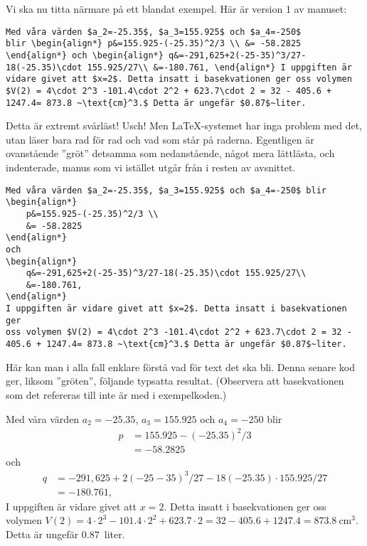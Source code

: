 \documentclass[a4paper,12pt]{article}
\begin{document}
Vi ska nu titta närmare på ett blandat exempel. Här är version 1 av
manuset:
%
\label{page:v1}
\begin{lstlisting} 
Med våra värden $a_2=-25.35$, $a_3=155.925$ och $a_4=-250$
blir \begin{align*} p&=155.925-(-25.35)^2/3 \\ &= -58.2825 
\end{align*} och \begin{align*} q&=-291,625+2(-25-35)^3/27-
18(-25.35)\cdot 155.925/27\\ &=-180.761, \end{align*} I uppgiften är
vidare givet att $x=2$. Detta insatt i basekvationen ger oss volymen
$V(2) = 4\cdot 2^3 -101.4\cdot 2^2 + 623.7\cdot 2 = 32 - 405.6 +
1247.4= 873.8 ~\text{cm}^3.$ Detta är ungefär $0.87$~liter. 
\end{lstlisting}
%
Detta är extremt svårläst! Usch! Men \LaTeX-systemet har inga problem med det,
utan läser bara rad för rad och vad som står på raderna.
Egentligen är ovanstående ''gröt'' detsamma som nedanstående,
något mera lättlästa, och indenterade, manus som vi istället utgår
från i resten av avsnittet.  
%
\begin{lstlisting}
Med våra värden $a_2=-25.35$, $a_3=155.925$ och $a_4=-250$ blir
\begin{align*}
    p&=155.925-(-25.35)^2/3 \\
    &= -58.2825
\end{align*}
och
\begin{align*}
    q&=-291,625+2(-25-35)^3/27-18(-25.35)\cdot 155.925/27\\
    &=-180.761,
\end{align*}
I uppgiften är vidare givet att $x=2$. Detta insatt i basekvationen ger
oss volymen $V(2) = 4\cdot 2^3 -101.4\cdot 2^2 + 623.7\cdot 2 = 32 -
405.6 + 1247.4= 873.8 ~\text{cm}^3.$ Detta är ungefär $0.87$~liter.
\end{lstlisting}
%
Här kan man i alla fall enklare förstå vad för text det ska bli. Denna
senare kod ger, liksom ''gröten'', följande typsatta
resultat. (Observera att basekvationen som det refereras till inte är
med i exempelkoden.)   
%
\begin{mdframed}
  Med våra värden $a_2=-25.35$, $a_3=155.925$ och $a_4=-250$ blir
  \begin{align*}
    p&=155.925-(-25.35)^2/3 \\
     &= -58.2825
  \end{align*}
  och
  \begin{align*}
    q&=-291,625+2(-25-35)^3/27-18(-25.35)\cdot 155.925/27\\
     &=-180.761,
  \end{align*}
  I uppgiften är vidare givet att $x=2$. Detta insatt i basekvationen
  ger oss volymen
  $V(2) = 4\cdot 2^3 -101.4\cdot 2^2 + 623.7\cdot 2 = 32 - 405.6 +
  1247.4= 873.8 ~\text{cm}^3.$ Detta är ungefär $0.87$~liter.
\end{mdframed}
\end{document}
